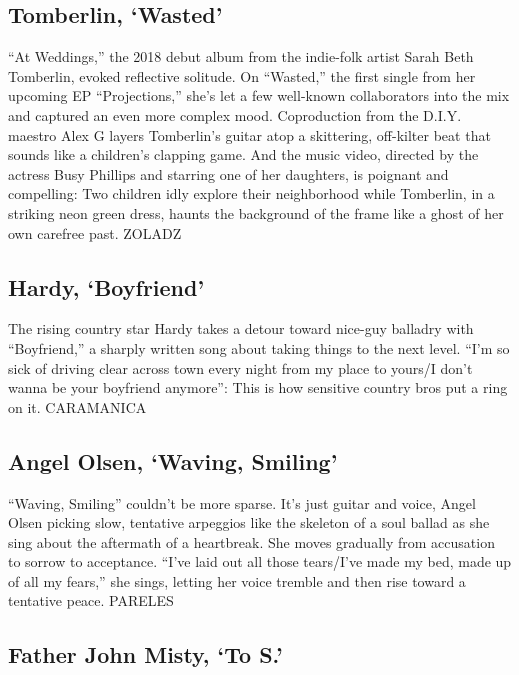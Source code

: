 \hypertarget{tomberlin-wasted}{%
\subsection{Tomberlin, `Wasted'}\label{tomberlin-wasted}}

``At Weddings,'' the 2018 debut album from the indie-folk artist Sarah
Beth Tomberlin, evoked reflective solitude. On ``Wasted,'' the first
single from her upcoming EP ``Projections,'' she's let a few well-known
collaborators into the mix and captured an even more complex mood.
Coproduction from the D.I.Y. maestro Alex G layers Tomberlin's guitar
atop a skittering, off-kilter beat that sounds like a children's
clapping game. And the music video, directed by the actress Busy
Phillips and starring one of her daughters, is poignant and compelling:
Two children idly explore their neighborhood while Tomberlin, in a
striking neon green dress, haunts the background of the frame like a
ghost of her own carefree past. ZOLADZ

\hypertarget{hardy-boyfriend}{%
\subsection{Hardy, `Boyfriend'}\label{hardy-boyfriend}}

The rising country star Hardy takes a detour toward nice-guy balladry
with ``Boyfriend,'' a sharply written song about taking things to the
next level. ``I'm so sick of driving clear across town every night from
my place to yours/I don't wanna be your boyfriend anymore'': This is how
sensitive country bros put a ring on it. CARAMANICA

\hypertarget{angel-olsen-waving-smiling}{%
\subsection{Angel Olsen, `Waving,
Smiling'}\label{angel-olsen-waving-smiling}}

``Waving, Smiling'' couldn't be more sparse. It's just guitar and voice,
Angel Olsen picking slow, tentative arpeggios like the skeleton of a
soul ballad as she sing about the aftermath of a heartbreak. She moves
gradually from accusation to sorrow to acceptance. ``I've laid out all
those tears/I've made my bed, made up of all my fears,'' she sings,
letting her voice tremble and then rise toward a tentative peace.
PARELES

\hypertarget{father-john-misty-to-s}{%
\subsection{Father John Misty, `To S.'}\label{father-john-misty-to-s}}

